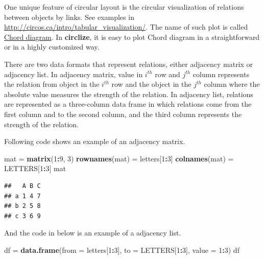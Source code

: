 \documentclass[]{book}
\newenvironment{Shaded}{\begin{snugshade}}{\end{snugshade}}
\newcommand{\KeywordTok}[1]{\textcolor[rgb]{0.13,0.29,0.53}{\textbf{#1}}}
\newcommand{\DataTypeTok}[1]{\textcolor[rgb]{0.13,0.29,0.53}{#1}}
\newcommand{\DecValTok}[1]{\textcolor[rgb]{0.00,0.00,0.81}{#1}}
\newcommand{\StringTok}[1]{\textcolor[rgb]{0.31,0.60,0.02}{#1}}
\newcommand{\OperatorTok}[1]{\textcolor[rgb]{0.81,0.36,0.00}{\textbf{#1}}}
\newcommand{\NormalTok}[1]{#1}
\begin{document}
One unique feature of circular layout is the circular visualization of
relations between objects by links. See examples in
\url{http://circos.ca/intro/tabular_visualization/}. The name of such
plot is called \href{http://en.wikipedia.org/wiki/Chord_diagram}{Chord
diagram}. In \textbf{circlize}, it is easy to plot Chord diagram in a
straightforward or in a highly customized way.

There are two data formats that represent relations, either adjacency
matrix or adjacency list. In adjacency matrix, value in \(i^{th}\) row
and \(j^{th}\) column represents the relation from object in the
\(i^{th}\) row and the object in the \(j^{th}\) column where the
absolute value measures the strength of the relation. In adjacency list,
relations are represented as a three-column data frame in which
relations come from the first column and to the second column, and the
third column represents the strength of the relation.

Following code shows an example of an adjacency matrix.

\begin{Shaded}
\begin{Highlighting}[]
\NormalTok{mat =}\StringTok{ }\KeywordTok{matrix}\NormalTok{(}\DecValTok{1}\OperatorTok{:}\DecValTok{9}\NormalTok{, }\DecValTok{3}\NormalTok{)}
\KeywordTok{rownames}\NormalTok{(mat) =}\StringTok{ }\NormalTok{letters[}\DecValTok{1}\OperatorTok{:}\DecValTok{3}\NormalTok{]}
\KeywordTok{colnames}\NormalTok{(mat) =}\StringTok{ }\NormalTok{LETTERS[}\DecValTok{1}\OperatorTok{:}\DecValTok{3}\NormalTok{]}
\NormalTok{mat}
\end{Highlighting}
\end{Shaded}

\begin{verbatim}
##   A B C
## a 1 4 7
## b 2 5 8
## c 3 6 9
\end{verbatim}

And the code in below is an example of a adjacency list.

\begin{Shaded}
\begin{Highlighting}[]
\NormalTok{df =}\StringTok{ }\KeywordTok{data.frame}\NormalTok{(}\DataTypeTok{from =}\NormalTok{ letters[}\DecValTok{1}\OperatorTok{:}\DecValTok{3}\NormalTok{], }\DataTypeTok{to =}\NormalTok{ LETTERS[}\DecValTok{1}\OperatorTok{:}\DecValTok{3}\NormalTok{], }\DataTypeTok{value =} \DecValTok{1}\OperatorTok{:}\DecValTok{3}\NormalTok{)}
\NormalTok{df}
\end{Highlighting}
\end{Shaded}
\end{document}
